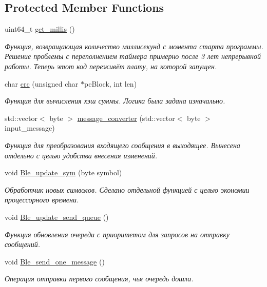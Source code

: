 \subsection*{Protected Member Functions}
\begin{DoxyCompactItemize}
\item 
uint64\+\_\+t \hyperlink{classBleConverter_a52ed15bca443802f8c3c5e2fdde0b82e}{get\+\_\+millis} ()
\begin{DoxyCompactList}\small\item\em Функция, возвращающая количество миллисекунд с момента старта программы.  Решение проблемы с переполнением таймера примерно после 3 лет непрерывной работы. Теперь этот код переживёт плату, на которой запущен. \end{DoxyCompactList}\item 
char \hyperlink{classBleConverter_a232fa1dd4c43d37201656235bde26173}{crc} (unsigned char $\ast$pc\+Block, int len)
\begin{DoxyCompactList}\small\item\em Функция для вычисления хэш суммы.  Логика была задана изначально. \end{DoxyCompactList}\item 
std\+::vector$<$ byte $>$ \hyperlink{classBleConverter_a3f14e0e1617f018a63ab32f65cd525a5}{message\+\_\+converter} (std\+::vector$<$ byte $>$ input\+\_\+message)
\begin{DoxyCompactList}\small\item\em Функция для преобразования входящего сообщения в выходящее.  Вынесена отдельно с целью удобства внесения изменений. \end{DoxyCompactList}\item 
void \hyperlink{classBleConverter_a9c8be58a0630f113cc98d1163aebc0fa}{Ble\+\_\+update\+\_\+sym} (byte symbol)
\begin{DoxyCompactList}\small\item\em Обработчик новых символов.  Сделано отдельной функцией с целью экономии процессорного времени. \end{DoxyCompactList}\item 
\mbox{\label{classBleConverter_a46793fb8aa5d69ddd6fe7a1da2198130}} 
void \hyperlink{classBleConverter_a46793fb8aa5d69ddd6fe7a1da2198130}{Ble\+\_\+update\+\_\+send\+\_\+queue} ()
\begin{DoxyCompactList}\small\item\em Функция обновления очереди с приоритетом для запросов на отправку сообщений. \end{DoxyCompactList}\item 
\mbox{\label{classBleConverter_a966f12ea117f813e474d1ee0f213ec52}} 
void \hyperlink{classBleConverter_a966f12ea117f813e474d1ee0f213ec52}{Ble\+\_\+send\+\_\+one\+\_\+message} ()
\begin{DoxyCompactList}\small\item\em Операция отправки первого сообщения, чья очередь дошла. \end{DoxyCompactList}\end{DoxyCompactItemize}
